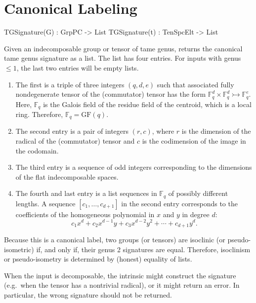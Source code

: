 \documentclass{documentation}
\begin{document}
\chapter{Canonical Labeling}

\begin{intrinsics}
TGSignature(G) : GrpPC -> List
TGSignature(t) : TenSpcElt -> List
\end{intrinsics}

Given an indecomposable group or tensor of tame genus, returns the canonical tame genus signature as a list. 
The list has four entries. For inputs with genus $\leq 1$, the last two entries will be empty lists. 
\begin{enumerate}
    \item The first is a triple of three integers $(q, d, e)$ such that associated fully nondegenerate tensor of the (commutator) tensor has the form $\mathbb{F}_q^d\times \mathbb{F}_q^d\rightarrowtail \mathbb{F}_q^e$. Here, $\mathbb{F}_q$ is the Galois field of the residue field of the centroid, which is a local ring. Therefore, $\mathbb{F}_q = \mathrm{GF}(q)$.
    \item The second entry is a pair of integers $(r, c)$, where $r$ is the dimension of the radical of the (commutator) tensor and $c$ is the codimension of the image in the codomain. 
    \item The third entry is a sequence of odd integers corresponding to the dimensions of the flat indecomposable spaces.
    \item The fourth and last entry is a list sequences in $\mathbb{F}_q$ of possibly different lengths. A sequence $[c_1,\dots, c_{d+1}]$ in the second entry corresponds to the coefficients of the homogeneous polynomial in $x$ and $y$ in degree $d$:
    \[ c_1x^d + c_2 x^{d-1}y + c_3 x^{d-2}y^2 + \cdots + c_{d+1}y^d. \]
\end{enumerate}
Because this is a canonical label, two groups (or tensors) are isoclinic (or pseudo-isometric) if, and only if, their genus 2 signatures are equal. Therefore, isoclinism or pseudo-isometry is determined by (honest) equality of lists. 

When the input is decomposable, the intrinsic might construct the signature (e.g.\ when the tensor has a nontrivial radical), or it might return an error. In particular, the wrong signature should not be returned. 
\end{document}
